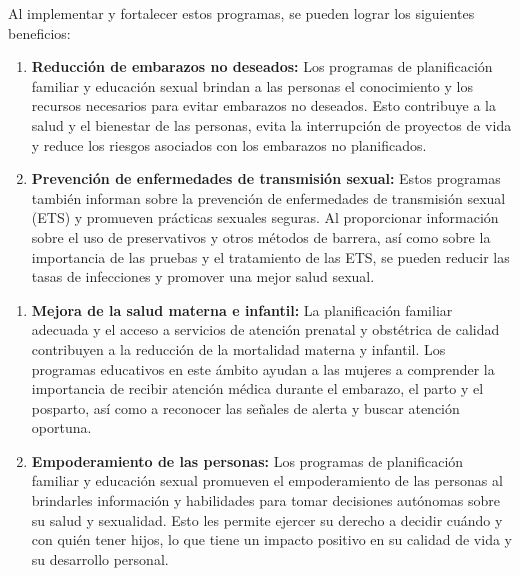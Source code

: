 \documentclass[8pt,a4paper]{beamer}
\begin{document}
{\begin{frame}{}
\begin{block}{}
\setlength{\parskip}{3px}
\justifying
Al implementar y fortalecer estos programas, se pueden lograr los siguientes beneficios:
\begin{enumerate}
\setlength{\parskip}{3px}
\justifying
\item[\ding{99}] \textbf{Reducción de embarazos no deseados:} Los programas de planificación familiar y educación sexual brindan a las personas el conocimiento y los recursos necesarios para evitar embarazos no deseados. Esto contribuye a la salud y el bienestar de las personas, evita la interrupción de proyectos de vida y reduce los riesgos asociados con los embarazos no planificados.

\item[\ding{99}] \textbf{Prevención de enfermedades de transmisión sexual:} Estos programas también informan sobre la prevención de enfermedades de transmisión sexual (ETS) y promueven prácticas sexuales seguras. Al proporcionar información sobre el uso de preservativos y otros métodos de barrera, así como sobre la importancia de las pruebas y el tratamiento de las ETS, se pueden reducir las tasas de infecciones y promover una mejor salud sexual.

\end{enumerate}
\end{block}
\end{frame}


\begin{frame}{}
\begin{block}{}
\setlength{\parskip}{3px}
\justifying

\begin{enumerate}
\setlength{\parskip}{3px}
\justifying
\item[\ding{99}] \textbf{Mejora de la salud materna e infantil:} La planificación familiar adecuada y el acceso a servicios de atención prenatal y obstétrica de calidad contribuyen a la reducción de la mortalidad materna y infantil. Los programas educativos en este ámbito ayudan a las mujeres a comprender la importancia de recibir atención médica durante el embarazo, el parto y el posparto, así como a reconocer las señales de alerta y buscar atención oportuna.

\item[\ding{99}] \textbf{Empoderamiento de las personas:} Los programas de planificación familiar y educación sexual promueven el empoderamiento de las personas al brindarles información y habilidades para tomar decisiones autónomas sobre su salud y sexualidad. Esto les permite ejercer su derecho a decidir cuándo y con quién tener hijos, lo que tiene un impacto positivo en su calidad de vida y su desarrollo personal.


\end{enumerate}
\end{block}
\end{frame}}
\end{document}
